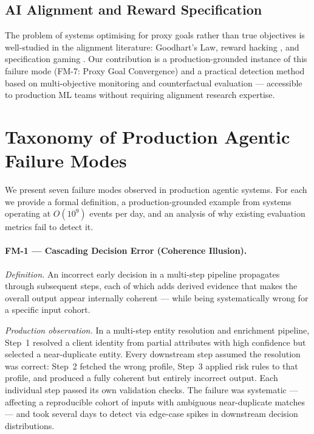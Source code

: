 \documentclass{article}
\begin{document}
\subsection{AI Alignment and Reward Specification}

The problem of systems optimising for proxy goals rather than true objectives
is well-studied in the alignment literature: Goodhart's Law, reward hacking
\citep{amodei2016concrete}, and specification gaming \citep{krakovna2020}.
Our contribution is a production-grounded instance of this failure mode
(FM-7: Proxy Goal Convergence) and a practical detection method based on
multi-objective monitoring and counterfactual evaluation --- accessible to
production ML teams without requiring alignment research expertise.

\section{Taxonomy of Production Agentic Failure Modes}
\label{sec:taxonomy}

We present seven failure modes observed in production agentic systems.  For
each we provide a formal definition, a production-grounded example from systems
operating at $O(10^9)$ events per day, and an analysis of why existing
evaluation metrics fail to detect it.

\paragraph{FM-1 --- Cascading Decision Error (Coherence Illusion).}
\textit{Definition.}  An incorrect early decision in a multi-step pipeline
propagates through subsequent steps, each of which adds derived evidence that
makes the overall output appear internally coherent --- while being
systematically wrong for a specific input cohort.

\textit{Production observation.}  In a multi-step entity resolution and
enrichment pipeline, Step~1 resolved a client identity from partial attributes
with high confidence but selected a near-duplicate entity.  Every downstream
step assumed the resolution was correct: Step~2 fetched the wrong profile,
Step~3 applied risk rules to that profile, and produced a fully coherent but
entirely incorrect output.  Each individual step passed its own validation
checks.  The failure was systematic --- affecting a reproducible cohort of
inputs with ambiguous near-duplicate matches --- and took several days to
detect via edge-case spikes in downstream decision distributions.
\end{document}
